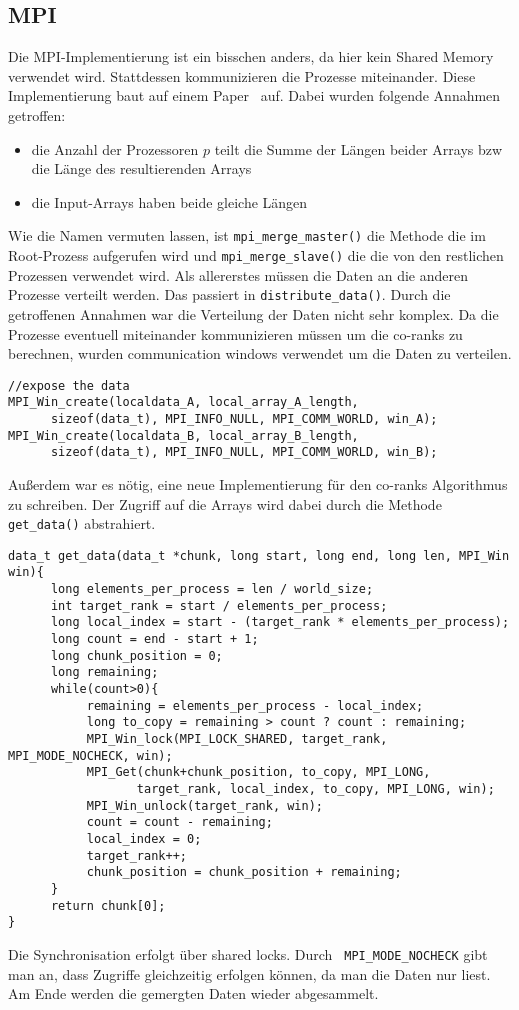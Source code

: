 \subsection{MPI}
Die MPI-Implementierung ist ein bisschen anders, da hier kein Shared Memory verwendet wird. Stattdessen kommunizieren die Prozesse miteinander. Diese Implementierung baut auf einem Paper~\cite{mpi} auf. Dabei wurden folgende Annahmen getroffen:
\begin{itemize}
\item die Anzahl der Prozessoren $p$ teilt die Summe der Längen beider Arrays bzw die Länge des resultierenden Arrays
\item die Input-Arrays haben beide gleiche Längen
\end{itemize}
Wie die Namen vermuten lassen, ist \verb|mpi_merge_master()| die Methode die im Root-Prozess aufgerufen wird und \verb|mpi_merge_slave()| die die von den restlichen Prozessen verwendet wird. Als allererstes müssen die Daten an die anderen Prozesse verteilt werden. Das passiert in \verb|distribute_data()|. Durch die getroffenen Annahmen war die Verteilung der Daten nicht sehr komplex. Da die Prozesse eventuell miteinander kommunizieren müssen um die co-ranks zu berechnen, wurden communication windows verwendet um die Daten zu verteilen.
\begin{verbatim}
//expose the data
MPI_Win_create(localdata_A, local_array_A_length, 
      sizeof(data_t), MPI_INFO_NULL, MPI_COMM_WORLD, win_A);
MPI_Win_create(localdata_B, local_array_B_length, 
      sizeof(data_t), MPI_INFO_NULL, MPI_COMM_WORLD, win_B);
\end{verbatim}
Außerdem war es nötig, eine neue Implementierung für den co-ranks Algorithmus zu schreiben. Der Zugriff auf die Arrays wird dabei durch die Methode \verb|get_data()| abstrahiert. 
\begin{verbatim}
data_t get_data(data_t *chunk, long start, long end, long len, MPI_Win win){
      long elements_per_process = len / world_size;
      int target_rank = start / elements_per_process;
      long local_index = start - (target_rank * elements_per_process);
      long count = end - start + 1;
      long chunk_position = 0;
      long remaining;
      while(count>0){
           remaining = elements_per_process - local_index;
           long to_copy = remaining > count ? count : remaining;
           MPI_Win_lock(MPI_LOCK_SHARED, target_rank, MPI_MODE_NOCHECK, win);
           MPI_Get(chunk+chunk_position, to_copy, MPI_LONG, 
                  target_rank, local_index, to_copy, MPI_LONG, win);
           MPI_Win_unlock(target_rank, win);
           count = count - remaining;
           local_index = 0;
           target_rank++;
           chunk_position = chunk_position + remaining;
      }
      return chunk[0];
}
\end{verbatim}
Die Synchronisation erfolgt über shared locks. Durch \verb| MPI_MODE_NOCHECK| gibt man an, dass Zugriffe gleichzeitig erfolgen können, da man die Daten nur liest. Am Ende werden die gemergten Daten wieder abgesammelt.